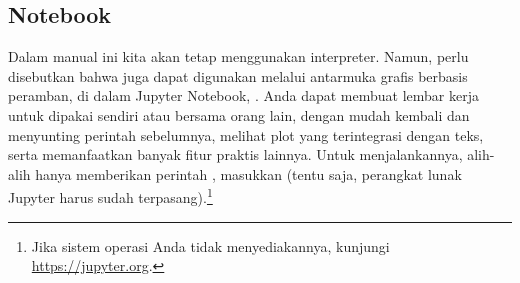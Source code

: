 \subsection{Notebook}
Dalam manual ini kita akan tetap menggunakan interpreter.
Namun, perlu disebutkan bahwa \Sage{} juga dapat digunakan melalui   
antarmuka grafis berbasis peramban, 
di dalam Jupyter Notebook, \cite{JupyterTeam19}.
Anda dapat membuat
lembar kerja untuk dipakai sendiri atau bersama orang lain, dengan mudah
kembali dan menyunting perintah sebelumnya, melihat plot yang terintegrasi dengan teks, 
serta memanfaatkan banyak fitur praktis lainnya.
Untuk menjalankannya, alih-alih hanya memberikan perintah ,
masukkan
(tentu saja, perangkat lunak Jupyter harus sudah
terpasang).\footnote{%
  Jika sistem operasi Anda tidak menyediakannya, kunjungi 
  \protect\url{https://jupyter.org}.}
\endinput
